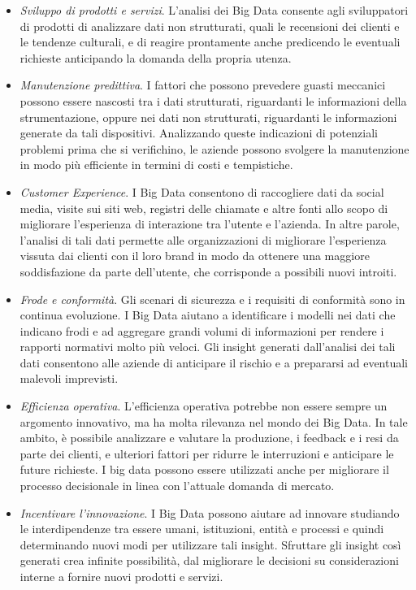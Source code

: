\begin{itemize}
    \item \textit{Sviluppo di prodotti e servizi}. L'analisi dei Big Data consente agli sviluppatori di prodotti di analizzare dati non strutturati, quali le recensioni dei clienti e le tendenze culturali, e di reagire prontamente anche predicendo le eventuali richieste anticipando la domanda della propria utenza.
    \item \textit{Manutenzione predittiva}. I fattori che possono prevedere guasti meccanici possono essere nascosti tra i dati strutturati, riguardanti le informazioni della strumentazione, oppure nei dati non strutturati, riguardanti le informazioni generate da tali dispositivi. Analizzando queste indicazioni di potenziali problemi prima che si verifichino, le aziende possono svolgere la manutenzione in modo più efficiente in termini di costi e tempistiche.
    \item \textit{Customer Experience}. I Big Data consentono di raccogliere dati da social media, visite sui siti web, registri delle chiamate e altre fonti allo scopo di migliorare l'esperienza di interazione tra l'utente e l'azienda. In altre parole, l'analisi di tali dati permette alle organizzazioni di migliorare l'esperienza vissuta dai clienti con il loro brand in modo da ottenere una maggiore soddisfazione da parte dell'utente, che corrisponde a possibili nuovi introiti.
    \item \textit{Frode e conformità}. Gli scenari di sicurezza e i requisiti di conformità sono in continua evoluzione. I Big Data aiutano a identificare i modelli nei dati che indicano frodi e ad aggregare grandi volumi di informazioni per rendere i rapporti normativi molto più veloci. Gli insight generati dall'analisi dei tali dati consentono alle aziende di anticipare il rischio e a prepararsi ad eventuali malevoli imprevisti.
    \item \textit{Efficienza operativa}. L'efficienza operativa potrebbe non essere sempre un argomento innovativo, ma ha molta rilevanza nel mondo dei Big Data. In tale ambito, è possibile analizzare e valutare la produzione, i feedback e i resi da parte dei clienti, e ulteriori fattori per ridurre le interruzioni e anticipare le future richieste. I big data possono essere utilizzati anche per migliorare il processo decisionale in linea con l'attuale domanda di mercato.
    \item \textit{Incentivare l'innovazione}. I Big Data possono aiutare ad innovare studiando le interdipendenze tra essere umani, istituzioni, entità e processi e quindi determinando nuovi modi per utilizzare tali insight. Sfruttare gli insight così generati crea infinite possibilità, dal migliorare le decisioni su considerazioni interne a fornire nuovi prodotti e servizi.
\end{itemize}

